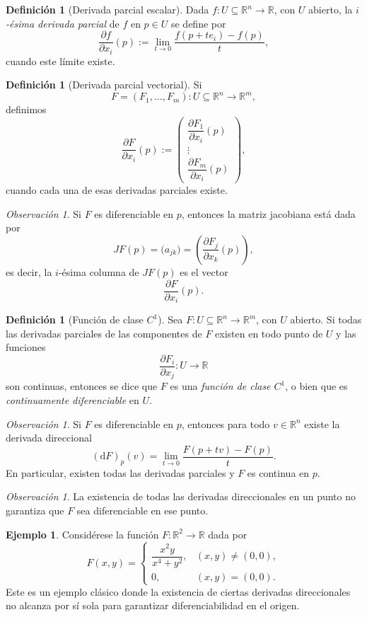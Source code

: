 \documentclass[11pt]{article}
\theoremstyle{definition}
\newtheorem{definition}[theorem]{Definici\'on}
\newtheorem{example}[theorem]{Ejemplo}
\theoremstyle{remark}
\newtheorem{remark}[theorem]{Observaci\'on}
\newcommand{\R}{\mathbb{R}}
\newcommand{\dd}{\mathrm{d}}
\begin{document}
\begin{definition}[Derivada parcial escalar]
Dada $f \colon U \subseteq \R^n \to \R$, con $U$ abierto, la \emph{$i$-\'esima derivada parcial} de $f$ en $p\in U$ se define por
\[
\frac{\partial f}{\partial x_i}(p)
:=
\lim_{t\to 0}\frac{f(p+t e_i)-f(p)}{t},
\]
cuando este l\'imite existe.
\end{definition}

\begin{definition}[Derivada parcial vectorial]
Si
\[
F=(F_1,\dots,F_m)\colon U \subseteq \R^n \to \R^m,
\]
definimos
\[
\frac{\partial F}{\partial x_i}(p)
:=
\begin{pmatrix}
\dfrac{\partial F_1}{\partial x_i}(p)\\[0.6em]
\vdots\\[0.2em]
\dfrac{\partial F_m}{\partial x_i}(p)
\end{pmatrix},
\]
cuando cada una de esas derivadas parciales existe.
\end{definition}

\begin{remark}
Si $F$ es diferenciable en $p$, entonces la matriz jacobiana est\'a dada por
\[
JF(p)=\bigl(a_{jk}\bigr)
=
\left(\frac{\partial F_j}{\partial x_k}(p)\right),
\]
es decir, la $i$-\'esima columna de $JF(p)$ es el vector
\[
\frac{\partial F}{\partial x_i}(p).
\]
\end{remark}

\begin{definition}[Funci\'on de clase $C^1$]
Sea $F \colon U \subseteq \R^n \to \R^m$, con $U$ abierto. Si todas las derivadas parciales de las componentes de $F$ existen en todo punto de $U$ y las funciones
\[
\frac{\partial F_i}{\partial x_j}\colon U \to \R
\]
son continuas, entonces se dice que $F$ es una \emph{funci\'on de clase $C^1$}, o bien que es \emph{continuamente diferenciable} en $U$.
\end{definition}

\begin{remark}
Si $F$ es diferenciable en $p$, entonces para todo $v\in \R^n$ existe la derivada direccional
\[
(\dd F)_p(v)
=
\lim_{t\to 0}\frac{F(p+tv)-F(p)}{t}.
\]
En particular, existen todas las derivadas parciales y $F$ es continua en $p$.
\end{remark}

\begin{remark}
La existencia de todas las derivadas direccionales en un punto no garantiza que $F$ sea diferenciable en ese punto.
\end{remark}

\begin{example}
Consid\'erese la funci\'on $F \colon \R^2 \to \R$ dada por
\[
F(x,y)=
\begin{cases}
\dfrac{x^2y}{x^4+y^2}, & (x,y)\neq (0,0),\\[0.6em]
0, & (x,y)=(0,0).
\end{cases}
\]
Este es un ejemplo cl\'asico donde la existencia de ciertas derivadas direccionales no alcanza por s\'i sola para garantizar diferenciabilidad en el origen.
\end{example}
\end{document}
